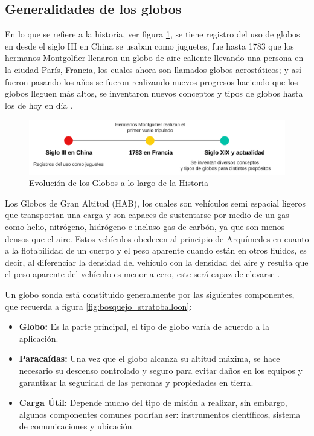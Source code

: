 \newpage

\subsection{Generalidades de los globos}

En lo que se refiere a la historia, ver figura \ref{fig:historia_globos},  se tiene registro del uso de globos en desde el siglo III en China se usaban como juguetes, fue hasta 1783 que los hermanos Montgolfier llenaron un globo de aire caliente llevando una persona en la ciudad París, Francia, los cuales ahora son llamados globos aerostáticos; y así fueron pasando los años se fueron realizando nuevos progresos haciendo que los globos lleguen más altos, se inventaron nuevos conceptos y tipos de globos hasta los de hoy en día \cite{history_type_balloon}.

\begin{figure}[!ht]
    \centering
    \includegraphics[width=0.5\linewidth]{document/figures/01_LineaTiempo_Globo_Historia.png}
    \caption{Evolución de los Globos a lo largo de la Historia}
    \label{fig:historia_globos}
\end{figure}

Los Globos de Gran Altitud (HAB), los cuales son vehículos semi espacial ligeros que transportan una carga y son capaces de sustentarse por medio de un gas como helio, nitrógeno, hidrógeno e incluso gas de carbón, ya que son menos densos que el aire. Estos vehículos obedecen al principio de Arquímedes en cuanto a la flotabilidad de un cuerpo y el peso aparente cuando están en otros fluidos, es decir, al diferenciar la densidad del vehículo con la densidad del aire y resulta que el peso aparente del vehículo es menor a cero, este será capaz de elevarse \cite{libro_fisica_giancoli}.

Un globo sonda está constituido generalmente por las siguientes componentes, que recuerda a figura \ref{fig:bosquejo_stratoballoon}:

\begin{itemize}
    \item \textbf{Globo:} Es la parte principal, el tipo de globo varía de acuerdo a la aplicación.
    \item \textbf{Paracaídas:} Una vez que el globo alcanza su altitud máxima, se hace necesario su descenso controlado y seguro para evitar daños en los equipos y garantizar la seguridad de las personas y propiedades en tierra.
    \item \textbf{Carga Útil:} Depende mucho del tipo de misión a realizar, sin embargo, algunos componentes comunes podrían ser: instrumentos científicos, sistema de comunicaciones y ubicación. 

\end{itemize}

